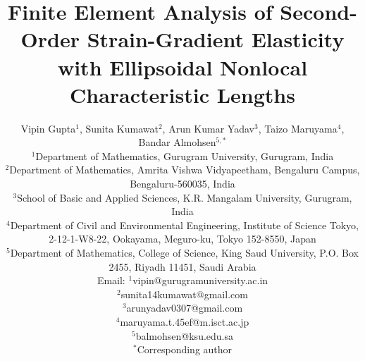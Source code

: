 \documentclass[final,3p,times,fleqn]{elsarticle}
\begin{document}
\begin{frontmatter}

\title{Finite Element Analysis of Second-Order Strain-Gradient Elasticity with Ellipsoidal Nonlocal Characteristic Lengths}


\author{
Vipin Gupta$^{1}$,
Sunita Kumawat$^{2}$,
Arun Kumar Yadav$^{3}$,
Taizo Maruyama$^{4}$,
Bandar Almohsen$^{5,*}$
\\
${}^{1}$Department of Mathematics, Gurugram University, Gurugram, India\\
${}^{2}$Department of Mathematics, Amrita Vishwa Vidyapeetham, Bengaluru Campus, Bengaluru-560035, India\\
${}^{3}$School of Basic and Applied Sciences, K.R. Mangalam University, Gurugram, India\\
${}^{4}$Department of Civil and Environmental Engineering, Institute of Science Tokyo, 2-12-1-W8-22, Ookayama, Meguro-ku, Tokyo 152-8550, Japan\\
${}^{5}$Department of Mathematics, College of Science, King Saud University, P.O. Box 2455, Riyadh 11451, Saudi Arabia\\
Email: $^{1}$vipin@gurugramuniversity.ac.in\\
$^{2}$sunita14kumawat@gmail.com\\
$^{3}$arunyadav0307@gmail.com\\
$^{4}$maruyama.t.45ef@m.isct.ac.jp\\
$^{5}$balmohsen@ksu.edu.sa\\
${}^{*}$Corresponding author
}




\end{frontmatter}
\end{document}
